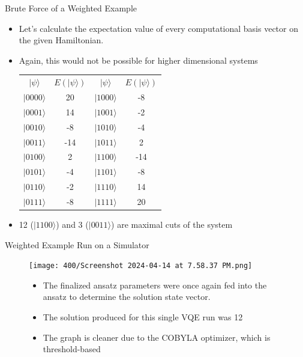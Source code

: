\begin{frame}{Brute Force of a Weighted Example}
    \begin{itemize}
        \item Let's calculate the expectation value of every computational basis vector on the given Hamiltonian. 
        \item Again, this would not be possible for higher dimensional systems
        
        \centering \begin{tabular}{c|c|c|c}
             $| \psi \rangle$& $E(| \psi \rangle)$ & $| \psi \rangle$ & $E(| \psi \rangle)$ \\
             $|0000\rangle$ & 20 & $|1000\rangle$ & -8 \\
             $|0001\rangle$ & 14 & $|1001\rangle$ & -2 \\
             $|0010\rangle$ & -8 & $|1010\rangle$ & -4 \\
             $|0011\rangle$ & -14 & $|1011\rangle$ & 2 \\
             $|0100\rangle$ & 2 & $|1100\rangle$ & -14 \\
             $|0101\rangle$ & -4 & $|1101\rangle$ & -8 \\
             $|0110\rangle$ & -2 & $|1110\rangle$ & 14 \\
             $|0111\rangle$ & -8 & $|1111\rangle$ & 20 \\
             
        \end{tabular}
        \item 12 ($|1100\rangle$) and 3 ($|0011\rangle$) are maximal cuts of the system
    \end{itemize}
\end{frame}

\begin{frame}{Weighted Example Run on a Simulator}
    \begin{figure}[h]
            \centering
            \texttt{[image: 400/Screenshot 2024-04-14 at 7.58.37 PM.png]}

    \begin{itemize}
        \item The finalized ansatz parameters were once again fed into the ansatz to determine the solution state vector.
        \item The solution produced for this single VQE run was 12
        \item The graph is cleaner due to the COBYLA optimizer, which is threshold-based
    \end{itemize}
    \end{figure}
\end{frame}

